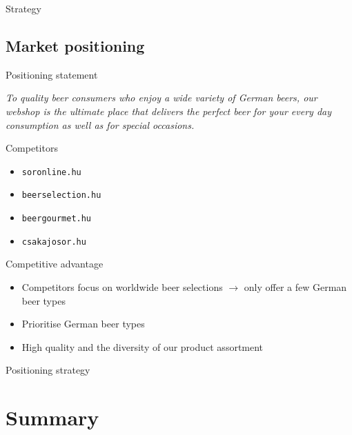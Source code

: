\documentclass[aspectratio=43]{beamer}
\begin{document}
\begin{frame}{Strategy}

\end{frame}



\subsection{Market positioning}

\begin{frame}{Positioning statement}


      \textit{To quality beer consumers who enjoy a wide variety of German beers, our webshop is the ultimate place that delivers the perfect beer for your every day consumption as well as for special occasions.}

\end{frame}



\begin{frame}{Competitors}
   \begin{itemize}
      \item \texttt{soronline.hu}
      \item \texttt{beerselection.hu}
      \item \texttt{beergourmet.hu}
      \item \texttt{csakajosor.hu} 
   \end{itemize}
\end{frame}

\begin{frame}{Competitive advantage}
\begin{itemize}
   \item Competitors focus on worldwide beer selections $\rightarrow$ only offer a few German beer types
   \item Prioritise German beer types
   \item High quality and the diversity of our product assortment
\end{itemize}
\end{frame}

\begin{frame}{Positioning strategy}

\end{frame}






\section{Summary}
\end{document}
